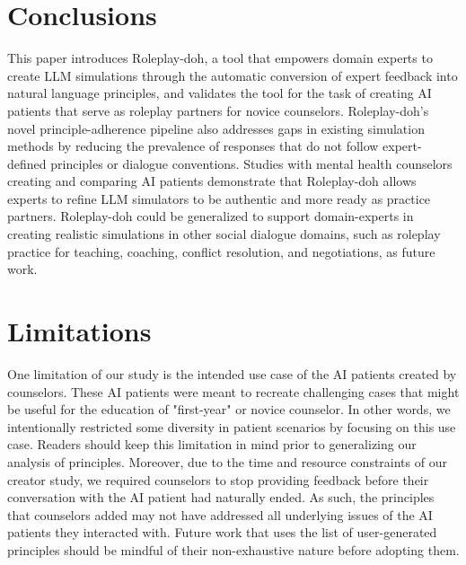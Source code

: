 \documentclass[11pt]{article}
\begin{document}
\section{Conclusions}\vspace{-0.05in}
This paper introduces Roleplay-doh, a tool that empowers domain experts to create 
LLM simulations through the automatic conversion of expert feedback into natural language principles, and validates the tool for the task of creating  AI patients that serve as roleplay partners for novice counselors. 
Roleplay-doh's novel principle-adherence pipeline also addresses gaps in existing simulation methods by reducing the prevalence of responses that do not follow expert-defined principles or dialogue conventions. 
Studies with mental health counselors creating and comparing AI patients demonstrate that Roleplay-doh allows experts to refine LLM simulators to be authentic and more ready as practice partners.
Roleplay-doh could be generalized to support domain-experts in creating realistic simulations in other social dialogue domains, such as roleplay practice for teaching, coaching, conflict resolution, and negotiations, as future work.

\section*{Limitations}

One limitation of our study is the intended use case of the AI patients created by counselors. These AI patients were meant to recreate challenging cases that might be useful for the education of "first-year" or novice counselor. In other words, we intentionally restricted some diversity in patient scenarios by focusing on this use case. Readers should keep this limitation in mind prior to generalizing our analysis of principles. Moreover, due to the time and resource constraints of our creator study, we required counselors to stop providing feedback before their conversation with the AI patient had naturally ended. 
As such, the principles that counselors added may not have addressed all underlying issues of the AI patients they interacted with. Future work that uses the list of user-generated principles should be mindful of their non-exhaustive nature before adopting them.
\end{document}

